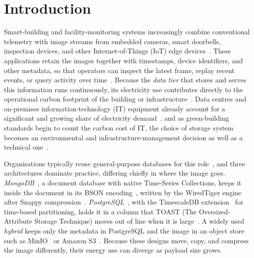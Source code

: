 \documentclass[pdflatex,sn-basic]{sn-jnl}%
\begin{document}
\section{Introduction}\label{sec:introduction}

Smart-building and facility-monitoring systems increasingly combine conventional telemetry with image streams from embedded cameras, smart doorbells, inspection devices, and other Internet-of-Things (IoT) edge devices~\citep{bajera_iot_smart_buildings,alfuqaha_iot_survey,saputri_building_monitoring}. These applications retain the images together with timestamps, device identifiers, and other metadata, so that operators can inspect the latest frame, replay recent events, or query activity over time~\citep{ceec_tsdb_review,jensen_tsms_survey,halim_iot_telemetry_sharing}. Because the \emph{data tier} that stores and serves this information runs continuously, its electricity use contributes directly to the operational carbon footprint of the building or infrastructure~\citep{nerc_tsdb_survey}. Data centres and on-premises information-technology (IT) equipment already account for a significant and growing share of electricity demand~\citep{masanet_datacenter_energy,shehabi_us_datacenter}, and as green-building standards begin to count the carbon cost of IT, the choice of storage system becomes an environmental and infrastructure-management decision as well as a technical one~\citep{ieee_ce_definition}.

Organisations typically reuse general-purpose databases for this role~\citep{intuz_iot_databases}, and three architectures dominate practice, differing chiefly in where the image goes. \emph{MongoDB}~\citep{mongodb_official}, a document database with native Time-Series Collections, keeps it inside the document in its BSON encoding~\citep{mongodb_bson_spec}, written by the WiredTiger engine~\citep{mongodb_wiredtiger_storage} after Snappy compression~\citep{google_snappy}. \emph{PostgreSQL}~\citep{postgresql_official}, with the TimescaleDB extension~\citep{timescaledb_official} for time-based partitioning, holds it in a column that TOAST (The Oversized-Attribute Storage Technique) moves out of line when it is large~\citep{postgresql_toast_docs}. A widely used \emph{hybrid} keeps only the metadata in PostgreSQL and the image in an object store such as MinIO~\citep{minio_official} or Amazon S3~\citep{aws_s3_official}. Because these designs move, copy, and compress the image differently, their energy use can diverge as payload size grows.
\end{document}
